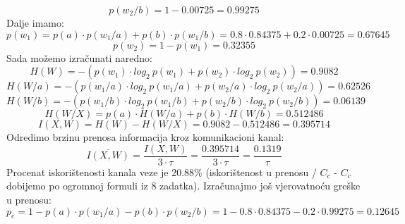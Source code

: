 \documentclass[12pt]{article}
\begin{document}
\begin{enumerate}
\begin{equation*}
\end{equation*}
\begin{equation*}
    p(w_2/b) = 1 - 0.00725 = 0.99275
\end{equation*}
Dalje imamo:
\begin{equation*}
    p(w_1) = p(a) \cdot p(w_1/a) + p(b) \cdot p(w_1/b) = 0.8 \cdot 0.84375 + 0.2 \cdot 0.00725 = 0.67645
\end{equation*}
\begin{equation*}
    p(w_2) = 1 - p(w_1) =  0.32355
\end{equation*}
Sada možemo izračunati naredno: \\
\begin{equation*}
    H(W) = -(p(w_1) \cdot log_2~p(w_1) + p(w_2) \cdot log_2~p(w_2)) = 0.9082
\end{equation*}
\begin{equation*}
    H(W/a) = -(p(w_1/a) \cdot log_2~p(w_1/a) + p(w_2/a) \cdot log_2~p(w_2/a)) = 0.62526
\end{equation*}
\begin{equation*}
    H(W/b) = -(p(w_1/b) \cdot log_2~p(w_1/b) + p(w_2/b) \cdot log_2~p(w_2/b)) = 0.06139
\end{equation*}
\begin{equation*}
    H(W/X) = p(a) \cdot H(W/a) + p(b) \cdot H(W/b) = 0.512486
\end{equation*}
\begin{equation*} 
    I(X,W) = H(W) - H(W/X) = 0.9082 - 0.512486 = 0.395714
\end{equation*}
Odredimo brzinu prenosa informacija kroz komunikacioni kanal:
\begin{equation*}
        \overline{I(X,W)} = \frac{I(X,W)}{3 \cdot \tau} = \frac{0.395714}{3 \cdot \tau} = \frac{0.1319}{\tau}
\end{equation*}
Procenat iskorištenosti kanala veze je 20.88\% (iskorištenost u prenosu / $C_c$ - $C_c$ dobijemo po ogromnoj formuli iz 8 zadatka). Izračunajmo još
vjerovatnoću greške u prenosu: 
\begin{equation*}
    p_e = 1 - p(a) \cdot p(w_1/a) - p(b) \cdot p(w_2/b) = 1 - 0.8 \cdot 0.84375 - 0.2 \cdot 0.99275 = 0.12645
\end{equation*} 
	\end{enumerate}
    
\end{document}
